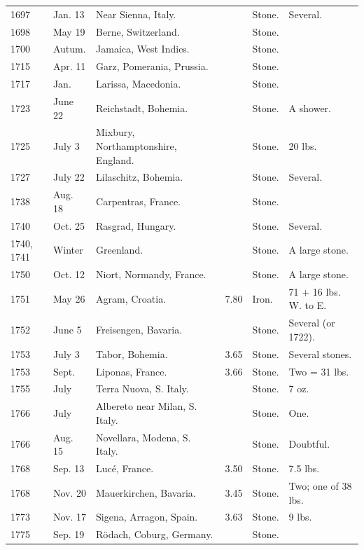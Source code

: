 \documentclass[a4paper, 12pt, oneside]{article}
\begin{document}
\begin{center}
\begin{longtable}{|p{10mm}|p{15mm}|p{32mm}|p{13mm}|p{13mm}|p{26mm}|}
        1697 & Jan. 13 & Near Sienna, Italy. & ~ & Stone. & Several. \\
        1698 & May 19 & Berne, Switzerland. & ~ & Stone. & ~ \\
        1700 & Autum. & Jamaica, West Indies. & ~ & Stone. & ~ \\
        1715 & Apr. 11 & Garz, Pomerania, Prussia. & ~ & Stone. & ~ \\
        1717 & Jan. & Larissa, Macedonia. & ~ & Stone. & ~ \\
        1723 & June 22 & Reichstadt, Bohemia. & ~ & Stone. & A shower. \\
        1725 & July 3 & Mixbury, Northamptonshire, England. & ~ & Stone. & 20 lbs. \\
        1727 & July 22 & Lilaschitz, Bohemia. & ~ & Stone. & Several. \\
        1738 & Aug. 18 & Carpentras, France. & ~ & Stone. & ~ \\
        1740 & Oct. 25 & Rasgrad, Hungary. & ~ & Stone. & Several. \\
        1740, 1741 & Winter & Greenland. & ~ & Stone. & A large stone. \\
        1750 & Oct. 12 & Niort, Normandy, France. & ~ & Stone. & A large stone. \\
        1751 & May 26 & Agram, Croatia. & 7.80 & Iron. & 71 + 16 lbs. W. to E. \\
        1752 & June 5 & Freisengen, Bavaria. & ~ & Stone. & Several (or 1722). \\
        1753 & July 3 & Tabor, Bohemia. & 3.65 & Stone. & Several stones. \\
        1753 & Sept. & Liponas, France. & 3.66 & Stone. & Two = 31 lbs. \\
        1755 & July & Terra Nuova, S. Italy. & ~ & Stone. & 7 oz. \\
        1766 & July & Albereto near Milan, S. Italy. & ~ & Stone. & One. \\
        1766 & Aug. 15 & Novellara, Modena, S. Italy. & ~ & Stone. & Doubtful. \\
        1768 & Sep. 13 & Lucé, France. & 3.50 & Stone. & 7.5 lbs. \\
        1768 & Nov. 20 & Mauerkirchen, Bavaria. & 3.45 & Stone. & Two; one of 38 lbs. \\
        1773 & Nov. 17 & Sigena, Arragon, Spain. & 3.63 & Stone. & 9 lbs. \\
        1775 & Sep. 19 & Rödach, Coburg, Germany. & ~ & Stone. & ~ \\

\end{longtable}
\end{center}
\end{document}

